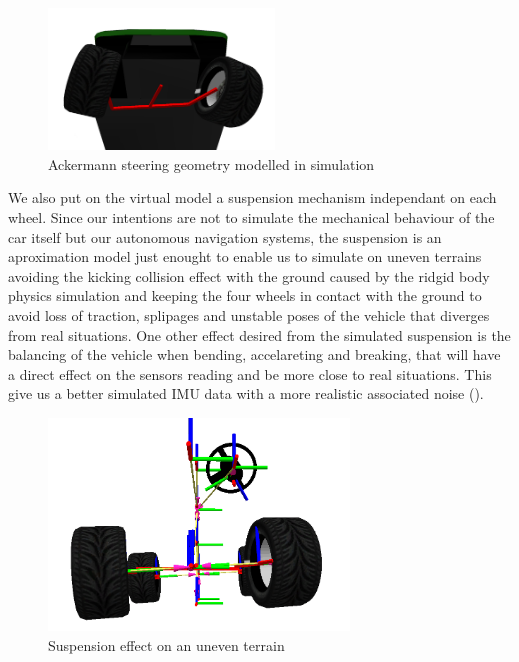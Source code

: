 \begin{figure}[h!]
	\begin{minipage}[b]{1\linewidth}
	    \centering
	    \includegraphics[width=6cm]{modelo_carina/carina_rviz_steering.png}
	 	\caption{Ackermann steering geometry modelled in simulation}
	 	\label{fig:ackermann}
	\end{minipage}
\end{figure}

We also put on the virtual model a suspension mechanism independant on each
wheel. Since our intentions are not to simulate the mechanical behaviour of the
car itself but our autonomous navigation systems, the suspension is an
aproximation model just enought to enable us to simulate on uneven terrains
avoiding the kicking collision effect with the ground caused by the ridgid body
physics simulation and keeping the four wheels in contact with the ground to
avoid loss of traction, splipages and unstable poses of the vehicle that
diverges from real situations. One other effect desired from the simulated
suspension is the balancing of the vehicle when bending, accelareting and
breaking, that will have a direct effect on the sensors reading and be more
close to real situations. This give us a better simulated IMU data with a more
realistic associated noise ().

\begin{figure}[ht]
	\begin{minipage}[b]{1\linewidth}
	    \centering
	    \includegraphics[width=8cm]{modelo_carina/carina_rviz_uneven_susp.png}
	 	\caption{Suspension effect on an uneven terrain}
	 	\label{fig:uneven}
	\end{minipage}
\end{figure}



 

